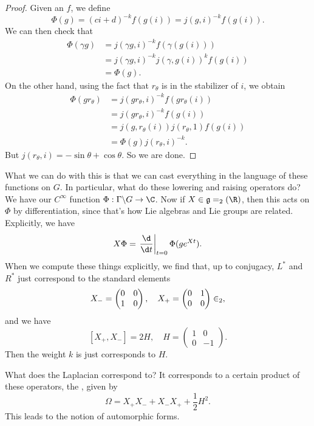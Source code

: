 \documentclass[a4paper]{article}
\begin{document}
\begin{proof}
  Given an $f$, we define
  \[
    \Phi(g) = (ci + d)^{-k} f(g(i)) = j(g, i)^{-k} f(g(i)).
  \]
  We can then check that
  \begin{align*}
    \Phi(\gamma g) &= j(\gamma g, i)^{-k} f(\gamma(g(i)))\\
    &= j(\gamma g, i)^{-k} j(\gamma, g(i))^k f(g(i))\\
    &= \Phi(g).
  \end{align*}
  On the other hand, using the fact that $r_\theta$ is in the stabilizer of $i$, we obtain
  \begin{align*}
    \Phi(g r_\theta) &= j(g r_\theta, i)^{-k} f(g r_\theta(i))\\
    &= j(g r_\theta, i)^{-k} f(g(i))\\
    &= j(g, r_\theta(i)) j(r_\theta, 1) f(g(i))\\
    &= \Phi(g) j (r_\theta, i)^{-k}.
  \end{align*}
  But $j(r_\theta, i) = - \sin \theta + \cos \theta$. So we are done.
\end{proof}

What we can do with this is that we can cast everything in the language of these functions on $G$. In particular, what do these lowering and raising operators do? We have our $C^\infty$ function $\Phi: \Gamma \backslash G \to \C$. Now if $X \in \mathfrak{g} = \sl_2(\R)$, then this acts on $\Phi$ by differentiation, since that's how Lie algebras and Lie groups are related. Explicitly, we have
\[
  X \Phi = \left.\frac{\d}{\d t}\right|_{t = 0} \Phi (g e^{Xt}).
\]
When we compute these things explicitly, we find that, up to conjugacy, $L^*$ and $R^*$ just correspond to the standard elements
\[
  X_- =
  \begin{pmatrix}
    0 & 0 \\
    1 & 0
  \end{pmatrix},\quad
  X_+ =
  \begin{pmatrix}
    0 & 1\\
    0 & 0
  \end{pmatrix} \in \sl_2,
\]
and we have
\[
  [X_+, X_-] = 2H,\quad H =
  \begin{pmatrix}
    1 & 0\\
    0 & -1
  \end{pmatrix}.
\]
Then the weight $k$ is just corresponds to $H$.

What does the Laplacian correspond to? It corresponds to a certain product of these operators, the , given by
\[
  \Omega = X_+ X_- + X_- X_+ + \frac{1}{2}H^2.
\]
This leads to the notion of automorphic forms.
\end{document}
